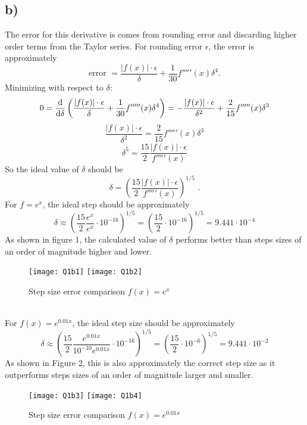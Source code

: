 \documentclass{article}
\newcommand{\<}[1]{\left\langle #1 \right\rangle }
\begin{document}
\subsection{b)}
The error for this derivative is comes from rounding error and discarding higher order terms from the Taylor series. For rounding error $\epsilon$, the error is approximately 
\[\text{error } = \frac{|f(x)|\cdot\epsilon}{\delta} + \frac{1}{30}f'''''(x)\delta^4 \text{.}\]
Minimizing with respect to $\delta$:
\[0 = \dv{}{\delta}\left( \frac{|f(x)|\cdot\epsilon}{\delta} + \frac{1}{30}f'''''(x)\delta^4 \right) = -\frac{|f(x)|\cdot \epsilon}{\delta^2} + \frac{2}{15}f'''''(x)\delta^3\]
\[\frac{|f(x)|\cdot \epsilon}{\delta^2} = \frac{2}{15}f'''''(x)\delta^3\]
\[\delta^5 = \frac{15}{2}\frac{|f(x)|\cdot \epsilon}{f'''''(x)}\]
So the ideal value of $\delta$ should be 
\[\boxed{ \delta = \left(\frac{15}{2}\frac{|f(x)|\cdot \epsilon}{f'''''(x)}\right)^{1/5} }\text{ .}\]
For $f = e^{x}$, the ideal step should be approximately
\[\delta \approx \left(\frac{15}{2}\frac{e^x}{e^x}\cdot10^{-16}\right)^{1/5} = \left(\frac{15}{2}\cdot10^{-16}\right)^{1/5} =  9.441\cdot10^{-4} \]
As shown in figure 1, the calculated value of $\delta$ performs better than steps sizes of an order of magnitude higher and lower.
\begin{figure}[h]
	\caption{Step size error comparison $f(x) = e^x$}
	\centering
	\texttt{[image: Q1b1]}
	\texttt{[image: Q1b2]}
\end{figure}
\\
For $f(x) = e^{0.01x}$, the ideal step size should be approximately
\[\delta \approx \left(\frac{15}{2}\frac{e^{0.01x}}{10^{-10}e^{0.01x}}\cdot 10^{-16} \right)^{1/5} = \left(\frac{15}{2} \cdot 10^{-6} \right)^{1/5} = 9.441\cdot 10^{-2} \]
As shown in Figure 2, this is also approximately the correct step size as it outperforms steps sizes of an order of magnitude larger and smaller.
\begin{figure}[h]
	\caption{Step size error comparison $f(x) = e^{0.01x}$}
	\centering
	\texttt{[image: Q1b3]}
	\texttt{[image: Q1b4]}
\end{figure}

\newpage
\end{document}
